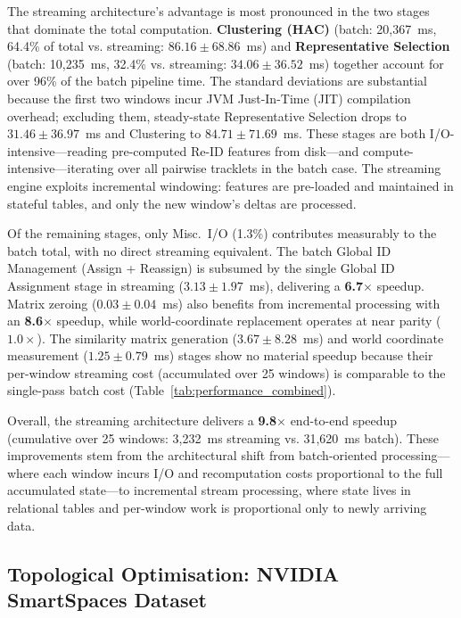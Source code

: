 \documentclass[5p,times]{elsarticle}
\begin{document}
The streaming architecture's advantage is most pronounced in the two stages that dominate the total computation. \textbf{Clustering (HAC)} (batch: 20,367~ms, 64.4\% of total vs. streaming: $86.16 \pm 68.86$~ms) and \textbf{Representative Selection} (batch: 10,235~ms, 32.4\% vs. streaming: $34.06 \pm 36.52$~ms) together account for over 96\% of the batch pipeline time. The standard deviations are substantial because the first two windows incur JVM Just-In-Time (JIT) compilation overhead; excluding them, steady-state Representative Selection drops to $31.46 \pm 36.97$~ms and Clustering to $84.71 \pm 71.69$~ms. These stages are both I/O-intensive---reading pre-computed Re-ID features from disk---and compute-intensive---iterating over all pairwise tracklets in the batch case. The streaming engine exploits incremental windowing: features are pre-loaded and maintained in stateful tables, and only the new window's deltas are processed.

Of the remaining stages, only Misc.\ I/O (1.3\%) contributes measurably to the batch total, with no direct streaming equivalent. The batch Global ID Management (Assign + Reassign) is subsumed by the single Global ID Assignment stage in streaming ($3.13 \pm 1.97$~ms), delivering a \textbf{6.7$\times$} speedup. Matrix zeroing ($0.03 \pm 0.04$~ms) also benefits from incremental processing with an \textbf{8.6$\times$} speedup, while world-coordinate replacement operates at near parity ($1.0\times$). The similarity matrix generation ($3.67 \pm 8.28$~ms) and world coordinate measurement ($1.25 \pm 0.79$~ms) stages show no material speedup because their per-window streaming cost (accumulated over 25 windows) is comparable to the single-pass batch cost
(Table~\ref{tab:performance_combined}).

Overall, the streaming architecture delivers a \textbf{9.8$\times$} end-to-end speedup (cumulative over 25 windows: 3,232~ms streaming vs. 31,620~ms batch). These improvements stem from the architectural shift from batch-oriented processing---where each window incurs I/O and recomputation costs proportional to the full accumulated state---to incremental stream processing, where state lives in relational tables and per-window work is proportional only to newly arriving data.

\subsection{Topological Optimisation: NVIDIA SmartSpaces Dataset}
\label{sec:eval:topology}
\end{document}
